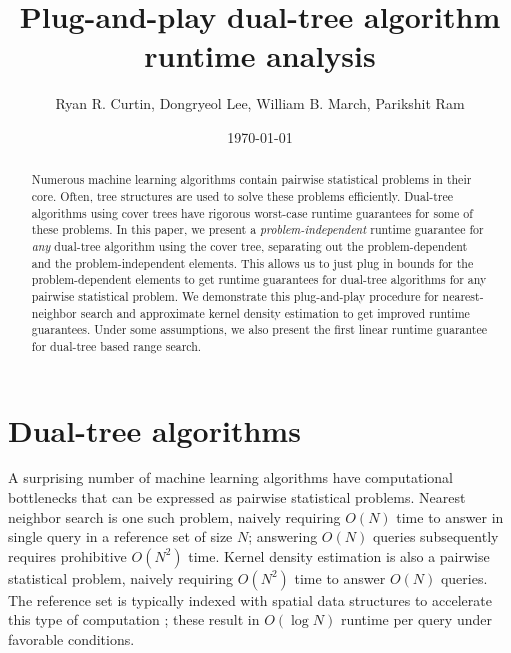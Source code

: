 \documentclass{article} %
\title{Plug-and-play dual-tree algorithm runtime analysis}
\author{Ryan R. Curtin, Dongryeol Lee, William B. March, Parikshit Ram}
\date{\today}
\begin{document}
\maketitle

\begin{abstract}
Numerous machine learning algorithms contain pairwise statistical problems in
their core. Often, tree structures are used to solve these problems efficiently.
Dual-tree algorithms using cover trees have rigorous worst-case runtime
guarantees for some of these problems. In this paper, we present a {\em
problem-independent} runtime guarantee for {\em any} dual-tree algorithm using
the cover tree, separating out the problem-dependent and the problem-independent
elements. This allows us to just plug in bounds for the problem-dependent
elements to get runtime guarantees for dual-tree algorithms for any pairwise
statistical problem. We demonstrate this plug-and-play procedure for
nearest-neighbor search and approximate kernel density estimation to get
improved runtime guarantees.  Under some assumptions, we also present the first
linear runtime guarantee for dual-tree based range search.
\end{abstract}


\section{Dual-tree algorithms}

A surprising number of machine learning algorithms have computational
bottlenecks that can be expressed as pairwise statistical problems.
Nearest neighbor search is one such problem, naively requiring $O(N)$ time
to answer in single query in a reference set of size $N$; answering $O(N)$
queries subsequently requires prohibitive $O(N^2)$ time. Kernel density
estimation is also a pairwise statistical problem, naively requiring $O(N^2)$
time to answer $O(N)$ queries. The reference set is typically indexed with
spatial data structures to accelerate this type of computation
\cite{finkel1974quad, langford2006}; these result in $O(\log N)$ runtime per
query under favorable conditions.
\end{document}
